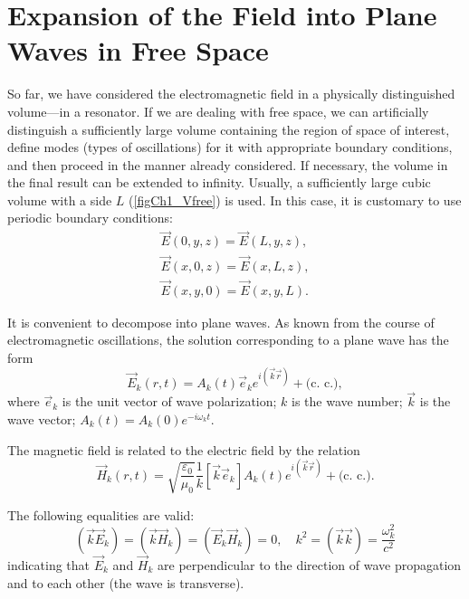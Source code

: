 \section{Expansion of the Field into Plane Waves in Free Space}
So far, we have considered the electromagnetic field in a physically
distinguished volume—in a resonator. If we are dealing with free
space, we can artificially distinguish a sufficiently large volume
containing the region of space of interest, define modes (types of oscillations) for it with appropriate boundary conditions, and then
proceed in the manner already considered. If necessary, the volume in
the final result can be extended to infinity. Usually, a sufficiently large cubic volume with a side $L$ 
(\autoref{figCh1_Vfree}) is used. In this case, it is customary to use
periodic boundary conditions:  
\begin{eqnarray}
\vec{E}\left(0, y, z \right) = \vec{E}\left(L, y, z \right),
\nonumber \\
\vec{E}\left(x, 0, z \right) = \vec{E}\left(x, L, z \right),
\nonumber \\
\vec{E}\left(x, y, 0 \right) = \vec{E}\left(x, y, L \right).
\label{eqCh1_period_def}
\end{eqnarray}



It is convenient to decompose into plane waves. As known from the course
of electromagnetic oscillations, the solution corresponding to a plane wave
has the form 
\begin{equation}
\vec{E}_k\left(r, t\right) = 
A_k\left(t\right)\vec{e}_k e^{i\left(\vec{k}\vec{r}\right)} +
\text{(c. c.)},
\label{eqCh1_Emode}
\end{equation}
where $\vec{e}_k$ is the unit vector of wave polarization;  
$k$ is the wave number; $\vec{k}$ is the wave vector;  
$A_k\left(t\right) = A_k\left(0\right) e^{-i \omega_k t}$.

The magnetic field is related to the electric field by the relation
\begin{equation}
\vec{H}_k\left(r, t\right) =
\sqrt{\frac{\varepsilon_0}{\mu_0}}
\frac{1}{k}\left[\vec{k} \vec{e}_k\right] A_k\left(t\right) 
e^{i\left(\vec{k}\vec{r}\right)} + \text{(c. c.)}
.
\label{eqCh1_Hmode}
\end{equation}

The following equalities are valid:
\begin{equation}
\left(\vec{k}\vec{E}_k\right) = 
\left(\vec{k}\vec{H}_k\right) = 
\left(\vec{E}_k\vec{H}_k\right) = 0,
\quad
k^2 = \left(\vec{k}\vec{k}\right) = 
\frac{\omega_k^2}{c^2} 
\end{equation}
indicating that 
$\vec{E}_k$
and $\vec{H}_k$ are perpendicular to the direction of wave propagation and to each
other (the wave is transverse). 

